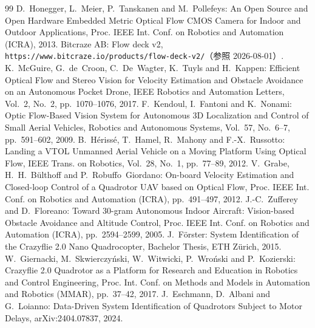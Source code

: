 \documentclass[a4paper,twocolumn,10pt]{ltjsarticle}
\begin{document}
\begin{thebibliography}{99}
 D.~Honegger, L.~Meier, P.~Tanskanen and M.~Pollefeys:
  An Open Source and Open Hardware Embedded Metric Optical Flow CMOS Camera
  for Indoor and Outdoor Applications, Proc. IEEE Int. Conf. on Robotics and
  Automation (ICRA), 2013.
 Bitcraze AB: Flow deck v2,
  \texttt{https://www.bitcraze.io/products/flow-deck-v2/}（参照 2026-08-01）.
 K.~McGuire, G.~de~Croon, C.~De~Wagter, K.~Tuyls and
  H.~Kappen: Efficient Optical Flow and Stereo Vision for Velocity Estimation
  and Obstacle Avoidance on an Autonomous Pocket Drone, IEEE Robotics and
  Automation Letters, Vol.~2, No.~2, pp.~1070--1076, 2017.
 F.~Kendoul, I.~Fantoni and K.~Nonami: Optic Flow-Based
  Vision System for Autonomous 3D Localization and Control of Small Aerial
  Vehicles, Robotics and Autonomous Systems, Vol.~57, No.~6--7,
  pp.~591--602, 2009.
 B.~H\'{e}riss\'{e}, T.~Hamel, R.~Mahony and
  F.-X.~Russotto: Landing a VTOL Unmanned Aerial Vehicle on a Moving
  Platform Using Optical Flow, IEEE Trans. on Robotics, Vol.~28, No.~1,
  pp.~77--89, 2012.
 V.~Grabe, H.~H.~B\"{u}lthoff and P.~Robuffo~Giordano:
  On-board Velocity Estimation and Closed-loop Control of a Quadrotor UAV
  based on Optical Flow, Proc. IEEE Int. Conf. on Robotics and Automation
  (ICRA), pp.~491--497, 2012.
 J.-C.~Zufferey and D.~Floreano: Toward 30-gram
  Autonomous Indoor Aircraft: Vision-based Obstacle Avoidance and Altitude
  Control, Proc. IEEE Int. Conf. on Robotics and Automation (ICRA),
  pp.~2594--2599, 2005.
 J.~Förster: System Identification of the Crazyflie 2.0
  Nano Quadrocopter, Bachelor Thesis, ETH Zürich, 2015.
 W.~Giernacki, M.~Skwierczy\'{n}ski, W.~Witwicki,
  P.~Wro\'{n}ski and P.~Kozierski: Crazyflie 2.0 Quadrotor as a Platform for
  Research and Education in Robotics and Control Engineering, Proc. Int.
  Conf. on Methods and Models in Automation and Robotics (MMAR),
  pp.~37--42, 2017.
 J.~Eschmann, D.~Albani and G.~Loianno: Data-Driven
  System Identification of Quadrotors Subject to Motor Delays,
  arXiv:2404.07837, 2024.
\end{thebibliography}
\end{document}
